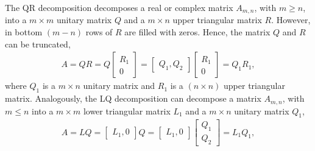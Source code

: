 The QR decomposition decomposes a real or complex matrix $A_{m,n}$, with $m \geq n$, into a $m \times m$ unitary matrix $Q$ and a $m \times n$ upper triangular matrix $R$. However, in bottom $(m-n)$ rows of $R$ are filled with zeros. Hence, the matrix $Q$ and $R$ can be truncated,
\begin{align}
	A = QR = Q \begin{bmatrix} R_1 \\ 0 \end{bmatrix} = \begin{bmatrix} Q_1, Q_2 \end{bmatrix} \begin{bmatrix} R_1 \\ 0 \end{bmatrix} = Q_1 R_1, 
\end{align}
where $Q_1$ is a $m \times n$ unitary matrix and $R_1$ is a $(n \times n)$ upper triangular matrix. Analogously, the LQ decomposition can decompose a matrix $A_{m,n}$, with $m \leq n$ into a $m \times m$ lower triangular matrix $L_1$ and a $m \times n$ unitary matrix $Q_1$, 
\begin{align}
	A = LQ = \begin{bmatrix} L_1, 0 \end{bmatrix} Q = \begin{bmatrix}  L_1, 0\end{bmatrix} \begin{bmatrix} Q_1 \\ Q_2 \end{bmatrix} = L_1 Q_1, 
\end{align}

